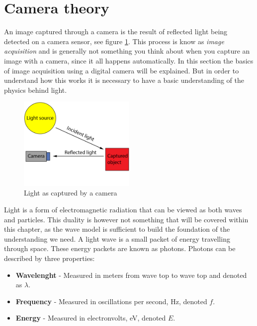\section{Camera theory}

An image captured through a camera is the result of reflected light being detected on a camera sensor, see figure \ref{fig:light_cam}. This process is know as \textit{image acquisition} and is generally not something you think about when you capture an image with a camera, since it all happens automatically. In this section the basics of image acquisition using a digital camera will be explained. But in order to understand how this works it is necessary to have a basic understanding of the physics behind light.

\begin{figure}[htbp] 
\centering 
\includegraphics[width=0.5\textwidth]{Pictures/Theory/light_from_sun.png} 
\caption{Light as captured by a camera} 
\label{fig:light_cam} 
\end{figure}

Light is a form of electromagnetic radiation that can be viewed as both waves and particles. This duality is however not something that will be covered within this chapter, as the wave model is sufficient to build the foundation of the understanding we need. A light wave is a small packet of energy travelling through space. These energy packets are known as photons. Photons can be described by three properties:

\begin{itemize}
\item \textbf{Wavelenght} - Measured in meters from wave top to wave top and denoted as $\lambda$.
\item \textbf{Frequency} - Measured in oscillations per second, Hz, denoted $f$.
\item \textbf{Energy} - Measured in electronvolts, eV, denoted $E$.
\end{itemize}

